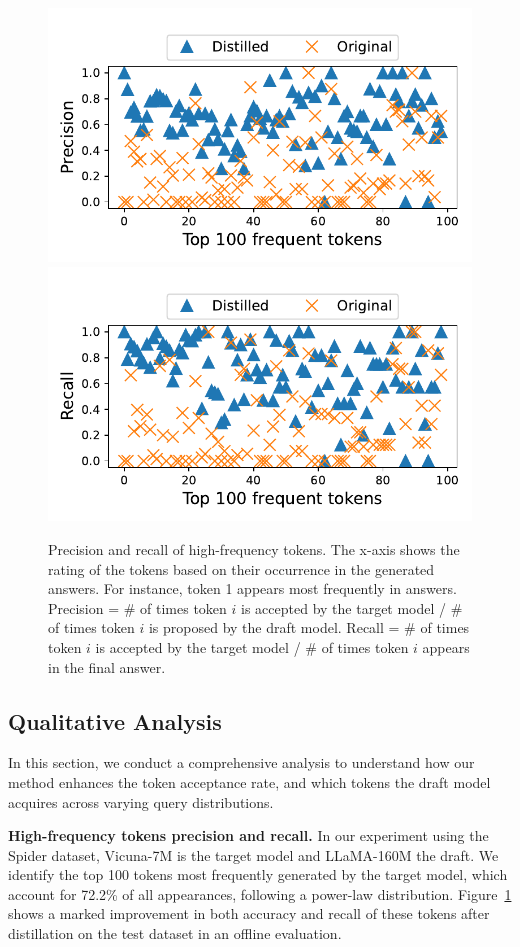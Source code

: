 \begin{figure} 
    \vspace{-10pt}
    \centering
    \includegraphics[width=0.4\linewidth]{figures/precision.pdf}
    \includegraphics[width=0.4\linewidth]{figures/recall.pdf}
    \vspace{-10pt}
    \caption{Precision and recall of high-frequency tokens. The x-axis shows the rating of the tokens based on their occurrence in the generated answers. For instance, token 1 appears most frequently in answers. Precision = \#  of times token $i$ is accepted by the target model / \# of times token $i$ is proposed by the draft model. Recall = \# of times token $i$ is accepted by the target model / \# of times token $i$ appears in the final answer.}
    \label{fig:freq-acc}
    \vspace{-10pt}
\end{figure}


\subsection{Qualitative Analysis}
In this section, we conduct a comprehensive analysis to understand how our method enhances the token acceptance rate, and which tokens the draft model acquires across varying query distributions.

{\bf High-frequency tokens precision and recall.} In our experiment using the Spider dataset, Vicuna-7M is the target model and LLaMA-160M the draft. 
We identify the top 100 tokens most frequently generated by the target model, which account for 72.2\% of all appearances, 
following a power-law distribution. Figure~\ref{fig:freq-acc} shows a marked improvement in both accuracy and recall
of these tokens after distillation on the test dataset in an offline evaluation. 

